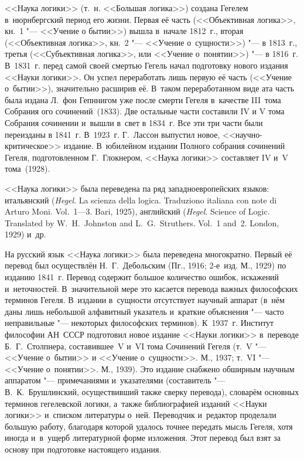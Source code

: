 <<Наука логики>> (т.~н. <<Большая логика>>) создана Гегелем в~нюрнбергский
период его жизни. Первая её часть (<<Объективная логика>>, кн.~1 "--- <<Учение
о бытии>>) вышла в~начале 1812~г., вторая (<<Объективная логика>>, кн.~2 "---
<<Учение о~сущности>>) "--- в 1813~г., третья (<<Субъективная логика>>, или
<<Учение о~понятии>>) "--- в 1816~г. В~1831~г. перед самой своей смертью Гегель
начал подготовку нового издания <<Науки логики>>. Он успел переработать лишь
первую её часть (<<Учение о~бытии>>), значительно расширив её. В~таком
переработанном виде ата часть была издана Л.~фон Гепннигом уже после смерти
Гегеля в~качестве III~тома Собрания ого сочинений~(1833). Две остальные части
составили IV и V тома Собрания сочинении и~вышли в~свет в 1834~г. Все эти три
части были переизданы в 1841~г. В~1923~г. Г.~Лассон выпустил новое,
<<научно-критическое>> издание. В~юбилейном издании Полного собрания сочинений
Гегеля, подготовленном Г.~Глокнером, <<Наука логики>>
составляет IV и~V тома~(1928).

<<Наука логики>> была переведена па ряд западноевропейских языков: итальянский
({\em Hegel}. La scienza della logica. Traduziono italiana con note di Arturo
Moni. Vol.~1---3. Bari, 1925), английский ({\em Hegel}. Science of Logic.
Translated by W.~H.~Johnston and L.~G.~Struthers. Vol.~1 and~2. London, 1929)
и~др.

На русский язык <<Наука логики>> была переведена многократно. Первый её перевод
был осуществлён Н.~Г.~Дебольским (Пг., 1916; 2-е~изд. М., 1929) по изданию
1841~г. Перевод содержит большое количество ошибок, искажений и~неточностей.
В~значительной мере это касается перевода важных философских терминов Гегеля.
В~издании в~сущности отсутствует научный аппарат (в~нём даны лишь небольшой
алфавитный указатель и~краткие объяснения "--- часто неправильные "---
некоторых философских терминов). К~1937~г. Институт философии АН~СССР
подготовил новое издание <<Науки логики>> в~переводе Б.~Г.~Столпнера,
составившее~V и~VI тома Сочинений Гегеля (т.~V "--- <<Учение о~бытии>> и
<<Учение о~сущности>>. М., 1937; т.~VI "--- <<Учение о~понятии>>. М., 1939).
Это издание снабжено обширным научным аппаратом "--- примечаниями и~указателями
(составитель "--- В.~К.~Брушлинский, осуществивший также сверку перевода),
словарём основных терминов гегелевской логики, а~также библиографией изданий
<<Науки логики>> и~списком литературы о~ней. Переводчик и~редактор проделали
большую работу, благодаря которой удалось точнее передать мысль Гегеля, хотя
иногда и~в~ущерб литературной форме изложения. Этот перевод был взят за основу
при подготовке настоящего издания.

\bigskip

\begin{center}
~~~~~~
\end{center}

\bigskip

\begin{footnotesize}
\printpagenotes
\end{footnotesize}
